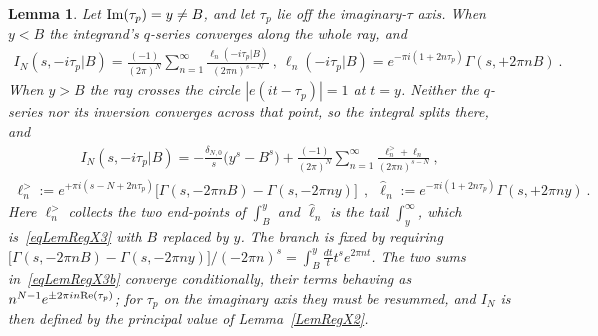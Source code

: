 \documentclass[11pt,a4paper]{article}
\newcommand{\G}{\Gamma}
\newtheorem{lem}[thm]{Lemma}
\begin{document}
\begin{lem}\label{LemRegX3}
Let  ${\rm Im}(\tau_p) = y \neq B$, and let $\tau_p$ lie off the imaginary-$\tau$ axis.
When $y < B$ the integrand's $q$-series converges along the whole ray, and
\begin{align}
I_N(s,-i\tau_p|B) = \frac{(-1)}{(2\pi)^N}\sum_{n = 1}^{\infty} \frac{ \ell_n(-i \tau_p|B) }{ (2 \pi n)^{s-N} }
~,~
\ell_n(-i\tau_p|B) = e^{-\pi i (1+2 n \tau_p)} \G(s,+2\pi n B)~.
\label{eqLemRegX3}
\end{align}
When $y > B$ the ray crosses the circle $|e(it - \tau_p)| = 1$ at $t = y$. Neither the $q$-series
nor its inversion converges across that point, so the integral splits there, and
\begin{align}
I_N(s,-i\tau_p|B) = -\frac{\delta_{N,0}}{s}\big(y^s - B^s\big)
+ \frac{(-1)}{(2\pi)^N}\sum_{n = 1}^{\infty} \frac{ \ell^>_n + \hat\ell_n }{ (2 \pi n)^{s-N} }~,
\label{eqLemRegX3b}
\end{align}
\begin{align}
\ell^>_n := e^{+\pi i (s-N+2 n \tau_p)}\big[\G(s, -2\pi n B) - \G(s,-2\pi n y)\big]
~~,~~
\hat\ell_n := e^{-\pi i (1+2 n \tau_p)} \G(s,+2\pi n y)~.
\label{eqLemRegX3c}
\end{align}
Here $\ell^>_n$ collects the two end-points of $\int_B^y$ and $\hat\ell_n$ is the tail
$\int_y^\infty$, which is~\eqref{eqLemRegX3} with $B$ replaced by $y$. The branch is fixed by
requiring $\big[\G(s,-2\pi nB)-\G(s,-2\pi ny)\big]/(-2\pi n)^s = \int_B^y \tfrac{dt}{t}t^s e^{2\pi n t}$.
The two sums in~\eqref{eqLemRegX3b} converge conditionally, their terms behaving as
$n^{N-1}e^{\pm 2\pi i n{\rm Re}(\tau_p)}$; for $\tau_p$ on the imaginary axis they must be
resummed, and $I_N$ is then defined by the principal value of Lemma~\ref{LemRegX2}.
\end{lem}
\end{document}
